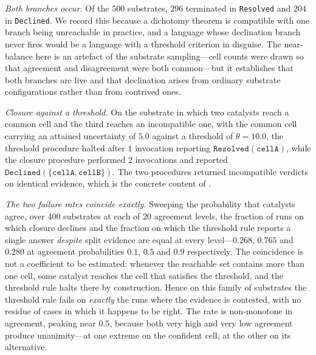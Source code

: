 \documentclass[11pt,a4paper]{article}
\theoremstyle{thmstyle}
\theoremstyle{definition}
\theoremstyle{remark}
\begin{document}
\emph{Both branches occur.} Of the $500$ substrates, $296$ terminated in
\texttt{Resolved} and $204$ in \texttt{Declined}. We record this because a
dichotomy theorem is compatible with one branch being unreachable in
practice, and a language whose declination branch never fires would be a
language with a threshold criterion in disguise. The near-balance here is an
artefact of the substrate sampling---cell counts were drawn so that agreement
and disagreement were both common---but it establishes that both branches
are live and that declination arises from ordinary substrate configurations
rather than from contrived ones.

\emph{Closure against a threshold.} On the substrate in which two catalysts
reach a common cell and the third reaches an incompatible one, with the
common cell carrying an attained uncertainty of $5.0$ against a threshold of
$\theta=10.0$, the threshold procedure halted after $1$ invocation reporting
$\texttt{Resolved}(\mathtt{cellA})$, while the closure procedure performed
$2$ invocations and reported
$\texttt{Declined}(\{\mathtt{cellA},\mathtt{cellB}\})$. The two procedures
returned incompatible verdicts on identical evidence, which is the concrete
content of .

\emph{The two failure rates coincide exactly.} Sweeping the probability that
catalysts agree, over $400$ substrates at each of $20$ agreement levels, the
fraction of runs on which closure declines and the fraction on which the
threshold rule reports a single answer \emph{despite} split evidence are
equal at every level---$0.268$, $0.765$ and $0.280$ at agreement
probabilities $0.1$, $0.5$ and $0.9$ respectively. The coincidence is not a
coefficient to be estimated: whenever the reachable set contains more than
one cell, some catalyst reaches the cell that satisfies the threshold, and
the threshold rule halts there by construction. Hence on this family of
substrates the threshold rule fails on \emph{exactly} the runs where the
evidence is contested, with no residue of cases in which it happens to be
right. The rate is non-monotone in agreement, peaking near $0.5$, because
both very high and very low agreement produce unanimity---at one extreme on
the confident cell, at the other on its alternative.
\end{document}
